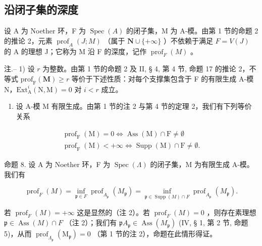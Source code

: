 \subsection{沿闭子集的深度}

设 A 为 Noether 环，F 为 \(\operatorname{Spec}(A)\) 的闭子集，M 为 A-模。由第 1 节的命题 2 的推论 2，元素 \(\operatorname{prof}_{A}(J;M)\) （属于 \(\mathbf{N} \cup \{+\infty\}\) ）不依赖于满足 \(F = V(J)\) 的 A 的理想 J；它称为 M 沿 F 的深度，记作 \(\operatorname{prof}_{F}(M)\) 。

注.-- 1) 设 \(r\) 为整数。由第 1 节的命题 2 及 II, § 4, 第 4 节, 命题 17 的推论 2，不等式 \(\mathrm{prof}_{\mathrm{F}}(\mathbf{M}) \geqslant r\) 等价于下述性质：对每个支撑集包含于 F 的有限生成 A-模 N，\(\mathrm{Ext}_{\mathrm{A}}^{i}(\mathrm{N},\mathrm{M}) = 0\) 对 \(i < r\) 成立。

\begin{enumerate}
\def\labelenumi{\arabic{enumi})}
\setcounter{enumi}{1}
\tightlist
\item
  设 A-模 M 有限生成。由第 1 节的注 2 与第 4 节的定理 2，我们有下列等价关系
\end{enumerate}

\[
\begin{array}{c} \operatorname{prof} _ {\mathrm{F}} (\mathrm{M}) = 0 \Longleftrightarrow \operatorname{Ass} (\mathrm{M}) \cap \mathrm{F} \neq \emptyset \\ \operatorname{prof} _ {\mathrm{F}} (\mathrm{M}) <   + \infty \Longleftrightarrow \operatorname{Supp} (\mathrm{M}) \cap \mathrm{F} \neq \emptyset . \end{array}
\]

命题 8. 设 A 为 Noether 环，F 为 \(\operatorname{Spec}(\Lambda)\) 的闭子集，M 为有限生成 A-模。我们有

\[
\operatorname{prof} _ {F} (M) = \inf _ {\mathfrak {p} \in F} \operatorname{prof} _ {A _ {\mathfrak {p}}} \left(M _ {\mathfrak {p}}\right) = \inf _ {\mathfrak {p} \in \operatorname{Supp} (M) \cap F} \operatorname{prof} _ {A _ {\mathfrak {p}}} \left(M _ {\mathfrak {p}}\right).
\]

若 \(\operatorname{prof}_{F}(M) = +\infty\) 这是显然的（注 2）。若 \(\operatorname{prof}_{F}(M) = 0\) ，则存在素理想 \(\mathfrak{p} \in \operatorname{Ass}(M) \cap F\) （注 2）；我们有 \(\mathfrak{p}A_{\mathfrak{p}} \in \operatorname{Ass}(M_{\mathfrak{p}})\) (IV, § 1, 第 2 节, 命题 5)，从而 \(\operatorname{prof}_{\Lambda_{\mathfrak{p}}}(\mathrm{M}_{\mathfrak{p}}) = 0\) （第 1 节的注 2），命题在此情形得证。

